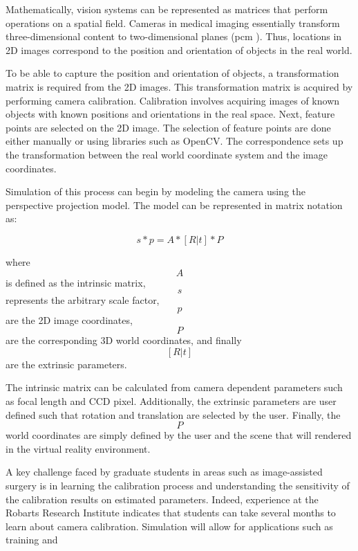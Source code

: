 \documentclass[11pt]{report}
\begin{document}


Mathematically, vision systems can be represented as matrices that perform operations on a spatial field. Cameras in medical imaging essentially transform three-dimensional content to two-dimensional planes (\gls{pcm} \cite{CV}). Thus, locations in 2D images correspond to the position and orientation of objects in the real world.

To be able to capture the position and orientation of objects, a transformation matrix is required from the 2D images. This transformation matrix is acquired by performing camera calibration. Calibration involves acquiring images of known objects with known positions and orientations in the real space. Next, feature points are selected on the 2D image. The selection of feature points are done either manually or using libraries such as OpenCV. The correspondence sets up the transformation between the real world coordinate system and the image coordinates.

Simulation of this process can begin by modeling the camera using the perspective projection model. The model can be represented in matrix notation as:

\begin{equation} s * p = A * [R|t] * P  \end{equation}
 
where  \[A\] is defined as the intrinsic matrix, \[s\] represents the arbitrary scale factor, \[p\] are the 2D image coordinates, \[P\] are the corresponding 3D world coordinates, and finally \[[R|t]\] are the extrinsic parameters.

The intrinsic matrix can be calculated from camera dependent parameters such as focal length and CCD pixel. Additionally, the extrinsic parameters are user defined such that rotation and translation are selected by the user. Finally, the \[P\] world coordinates are simply defined by the user and the scene that will rendered in the virtual reality environment. 

A key challenge faced by graduate students in areas such as image-assisted surgery is in learning the calibration process and understanding the sensitivity of the calibration results on estimated parameters. Indeed, experience at the Robarts Research Institute indicates that students can take several months to learn about camera calibration. Simulation will allow for applications such as training and 
\end{document}
